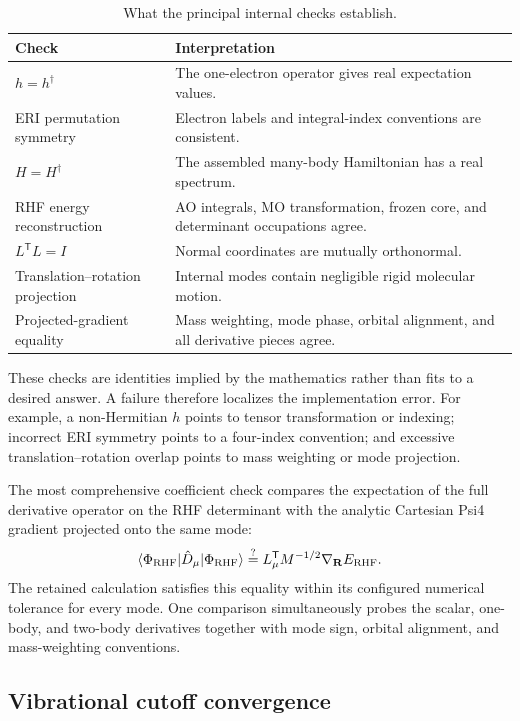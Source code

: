 \documentclass[10pt,twocolumn]{article}
\begin{document}
\begin{table}[ht]
\centering
\caption{What the principal internal checks establish.}
\scriptsize
\begin{tabular}{@{}p{}p{}@{}}
\toprule
Check & Interpretation\\\midrule
$h=h^\dagger$ & The one-electron operator gives real expectation values.\\
ERI permutation symmetry & Electron labels and integral-index conventions are consistent.\\
$H=H^\dagger$ & The assembled many-body Hamiltonian has a real spectrum.\\
RHF energy reconstruction & AO integrals, MO transformation, frozen core, and determinant occupations agree.\\
$L^{\mathsf T}L=I$ & Normal coordinates are mutually orthonormal.\\
Translation--rotation projection & Internal modes contain negligible rigid molecular motion.\\
Projected-gradient equality & Mass weighting, mode phase, orbital alignment, and all derivative pieces agree.\\
\bottomrule
\end{tabular}
\label{tab:checks}
\end{table}

These checks are identities implied by the mathematics rather than fits to a
desired answer.  A failure therefore localizes the implementation error.  For
example, a non-Hermitian $h$ points to tensor transformation or indexing;
incorrect ERI symmetry points to a four-index convention; and excessive
translation--rotation overlap points to mass weighting or mode projection.

The most comprehensive coefficient check compares the expectation of the full
derivative operator on the RHF determinant with the analytic Cartesian Psi4
gradient projected onto the same mode:
\begin{equation}
\langle\Phi_{\rm RHF}|\hat D_\mu|\Phi_{\rm RHF}\rangle
\stackrel{?}{=}L_\mu^{\mathsf T}M^{-1/2}\nabla_{\mathbf R}E_{\rm RHF}.
\label{eq:gradient-check}
\end{equation}
The retained calculation satisfies this equality within its configured
numerical tolerance for every mode.  One comparison simultaneously probes the
scalar, one-body, and two-body derivatives together with mode sign, orbital
alignment, and mass-weighting conventions.

\subsection*{Vibrational cutoff convergence}
\end{document}
